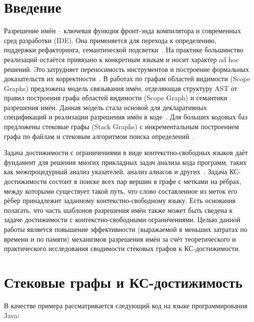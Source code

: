 \section{Введение}\label{sec:introduction}

Разрешение имён -- ключевая функция фронт-энда компилятора и современных сред разработки (IDE). Она применяется для перехода к определению, поддержки рефакторинга, семантической подсветки~\cite{Neron2015,vanAntwerpen2018}. На практике большинство реализаций остаётся привязано к конкретным языкам и носит характер ad hoc решений. Это затрудняет переносимость инструментов и построение формальных доказательств их корректности~\cite{vanAntwerpen2018,Zwaan2023}. В работах по графам областей видимости (Scope Graphs) предложена модель связывания имён, отделяющая структуру AST от правил построения графа областей видимости (Scope Graph) и семантики разрешения имён. Данная модель стала основой для декларативных спецификаций и реализации разрешения имён в коде~\cite{Neron2015,vanAntwerpen2018,Zwaan2023}. Для больших кодовых баз предложены стековые графы (Stack Graphs) с инкрементальным построением графа по файлам и стековым алгоритмом поиска определений~\cite{Creager2023}.

Задача достижимости с ограничениями в виде контекстно-свободных языков даёт фундамент для решения многих прикладных задач анализа кода программ, таких как межпроцедурный анализ указателей, анализ алиасов и других~\cite{RepsHorwitzSagiv1995,Hellings2015,HeLuXue2024}. Задача КС-достижимости состоит в поиске всех пар вершин в графе с метками на рёбрах, между которыми существует такой путь, что слово составленное из меток его рёбер принадлежит заданному контекстно-свободному языку. Есть основания полагать, что часть шаблонов разрешения имён также может быть сведена к задаче достижимости с контекстно-свободными ограничениями. Целью данной работы является повышение эффективности (выражаемой в меньших затратах по времени и по памяти) механизмов разрешения имён за счёт теоретического и практического исследования сводимости стековых графов к КС-достижимости.

\section{Стековые графы и КС-достижимость}\label{sec:models}

В качестве примера рассматривается следующий код на языке программирования Java:

